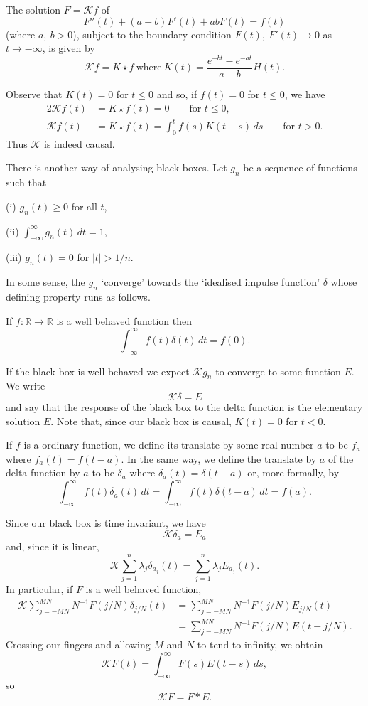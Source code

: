 \begin{lemma}\label{Lemma, big star}
The solution $F={\mathcal K}f$ of
\begin{equation*}
\tag*{$\bigstar$}
F''(t)+(a+b)F'(t)+ab F(t)=f(t)
\end{equation*}
(where $a,\ b>0$), subject to the boundary condition
$F(t),\ F'(t)\rightarrow 0$ as $t\rightarrow -\infty$,
is given by
\[{\mathcal K}f=K\star f
\ \text{where}\ K(t)=\frac{e^{-bt}-e^{-at}}{a-b}H(t).\]
\end{lemma}

Observe that $K(t)=0$ for $t\leq 0$ and so, if $f(t)=0$
for $t\leq 0$, we have
\begin{alignat*}{2}
{\mathcal K}f(t)&=K\star f(t)=0\qquad\text{for $t\leq 0$},\\
{\mathcal K}f(t)&=K\star f(t)=\int_{0}^{t}f(s)K(t-s)\,ds
\qquad\text{for $t>0$}.
\end{alignat*}
Thus ${\mathcal K}$ is indeed causal.

There is another way of analysing black boxes. Let
$g_{n}$ be a sequence of functions such that

(i) $g_{n}(t)\geq 0$ for all $t$,

(ii) ${\displaystyle \int_{-\infty}^{\infty}g_{n}(t)\,dt=1}$,

(iii) $g_{n}(t)=0$ for $|t|>1/n$.

\noindent In some sense, the $g_{n}$ `converge' towards
the `idealised impulse function' $\delta$ whose
defining property runs as follows.
\begin{definition} If $f:{\mathbb R}\rightarrow{\mathbb R}$
is a well behaved function then
\[\int_{-\infty}^{\infty}f(t)\delta(t)\,dt=f(0).\]
\end{definition}
If the black box is well behaved we expect ${\mathcal K}g_{n}$
to converge to some function $E$. We write
\[{\mathcal K}\delta=E\]
and say that the response of the black box to the delta
function is the elementary solution $E$. Note that,
since our black box is causal, $K(t)=0$ for $t<0$.

If $f$ is a ordinary function, we define its translate
by some real number $a$ to be $f_{a}$ where
$f_{a}(t)=f(t-a)$. In the same way, we define the
translate by $a$ of the delta function by $a$ to be
$\delta_{a}$ where $\delta_{a}(t)=\delta(t-a)$ or,
more formally, by
\[\int_{-\infty}^{\infty}f(t)\delta_{a}(t)\,dt=
\int_{-\infty}^{\infty}f(t)\delta(t-a)\,dt=f(a).\]

Since our black box is time invariant, we have
\[{\mathcal K}\delta_{a}=E_{a}\]
and, since it is linear,
\[{\mathcal K}\sum_{j=1}^{n}\lambda_{j}\delta_{a_{j}}(t)=
\sum_{j=1}^{n}\lambda_{j}E_{a_{j}}(t).\]
In particular, if $F$ is a well behaved function,
\begin{align*}
{\mathcal K}\sum_{j=-MN}^{MN}N^{-1}F(j/N)\delta_{j/N}(t)&=
\sum_{j=-MN}^{MN}N^{-1}F(j/N)E_{j/N}(t)\\
&=\sum_{j=-MN}^{MN}N^{-1}F(j/N)E(t-j/N).
\end{align*}
Crossing our fingers and allowing $M$ and $N$ to tend
to infinity, we obtain
\[{\mathcal K}F(t)=\int_{-\infty}^{\infty}F(s)E(t-s)\,ds,\]
so
\[{\mathcal K}F=F*E.\]

